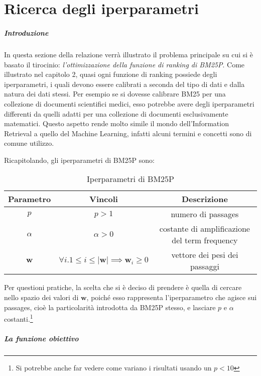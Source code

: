 \chapter{Ricerca degli iperparametri}

\paragraph{Introduzione}
In questa sezione della relazione verrà illustrato il problema principale su cui si è basato il tirocinio:
\textit{l'ottimizzazione della funzione di ranking di BM25P}.
Come illustrato nel capitolo 2, quasi ogni funzione di ranking possiede degli iperparametri, i quali
devono essere calibrati a seconda del tipo di dati e dalla natura dei dati stessi.
Per esempio se si dovesse calibrare BM25 per una collezione
di documenti scientifici medici, esso potrebbe avere degli iperparametri
differenti da quelli adatti per una collezione di documenti esclusivamente matematici.
Questo aspetto rende molto simile il mondo dell'Information Retrieval a quello del Machine Learning,
infatti alcuni termini e concetti sono di comune utilizzo.


Ricapitolando, gli iperparametri di BM25P sono:
\begin{table}[h!]
	\centering
	\begin{tabular}{|c|c|c|}
		\hline
		Parametro & Vincoli & Descrizione \\
		\hline
		$p$ & $p>1$ & numero di passages \\
		\hline
		$\alpha$ & $\alpha > 0$ & costante di amplificazione del term frequency \\
		\hline
		$\boldsymbol{w}$ & $\forall{i.1 \leq i \leq \left|\boldsymbol{w}\right|}\implies \boldsymbol{w}_i \geq 0$ & vettore dei pesi dei passaggi \\
		\hline
	\end{tabular}
\caption{Iperparametri di BM25P}
\end{table}

Per questioni pratiche, la scelta che si è deciso di prendere è quella di cercare
nello spazio dei valori di $\boldsymbol{w}$, poiché esso rappresenta l'iperparametro
che agisce sui passages, cioè la particolarità introdotta da BM25P stesso, e lasciare
$p$ e $\alpha$ costanti.\footnote{Si potrebbe anche far vedere come variano i risultati usando un $p<10$}

\paragraph{La funzione obiettivo}

